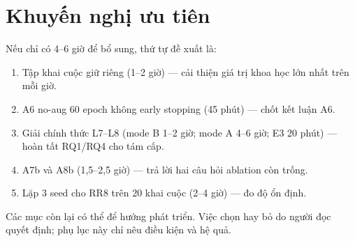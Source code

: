 \section{Khuyến nghị ưu tiên}
Nếu chỉ có 4--6 giờ để bổ sung, thứ tự đề xuất là:
\begin{enumerate}
  \item Tập khai cuộc giữ riêng (1--2 giờ) — cải thiện giá trị khoa học lớn nhất trên mỗi giờ.
  \item A6 no-aug 60 epoch không early stopping (45 phút) — chốt kết luận A6.
  \item Giải chính thức L7--L8 (mode B 1--2 giờ; mode A 4--6 giờ; E3 20 phút) — hoàn tất RQ1/RQ4 cho tám cấp.
  \item A7b và A8b (1,5--2,5 giờ) — trả lời hai câu hỏi ablation còn trống.
  \item Lặp 3 seed cho RR8 trên 20 khai cuộc (2--4 giờ) — đo độ ổn định.
\end{enumerate}
Các mục còn lại có thể để hướng phát triển. Việc chọn hay bỏ do người đọc quyết định; phụ lục
này chỉ nêu điều kiện và hệ quả.